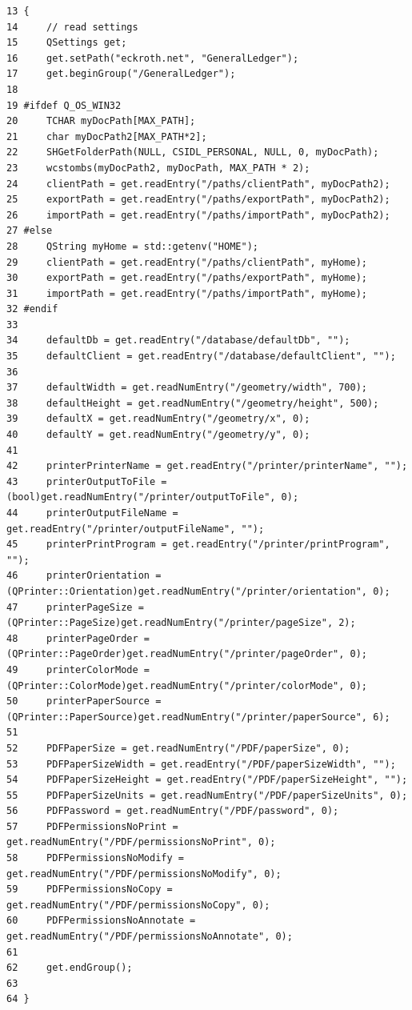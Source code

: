 \footnotesize\begin{verbatim}13 {
14     // read settings
15     QSettings get;
16     get.setPath("eckroth.net", "GeneralLedger");
17     get.beginGroup("/GeneralLedger");
18     
19 #ifdef Q_OS_WIN32
20     TCHAR myDocPath[MAX_PATH];
21     char myDocPath2[MAX_PATH*2];
22     SHGetFolderPath(NULL, CSIDL_PERSONAL, NULL, 0, myDocPath);
23     wcstombs(myDocPath2, myDocPath, MAX_PATH * 2);
24     clientPath = get.readEntry("/paths/clientPath", myDocPath2);
25     exportPath = get.readEntry("/paths/exportPath", myDocPath2);
26     importPath = get.readEntry("/paths/importPath", myDocPath2);
27 #else
28     QString myHome = std::getenv("HOME");
29     clientPath = get.readEntry("/paths/clientPath", myHome);
30     exportPath = get.readEntry("/paths/exportPath", myHome);
31     importPath = get.readEntry("/paths/importPath", myHome);
32 #endif
33 
34     defaultDb = get.readEntry("/database/defaultDb", "");
35     defaultClient = get.readEntry("/database/defaultClient", "");
36 
37     defaultWidth = get.readNumEntry("/geometry/width", 700);
38     defaultHeight = get.readNumEntry("/geometry/height", 500);
39     defaultX = get.readNumEntry("/geometry/x", 0);
40     defaultY = get.readNumEntry("/geometry/y", 0);
41 
42     printerPrinterName = get.readEntry("/printer/printerName", "");
43     printerOutputToFile = (bool)get.readNumEntry("/printer/outputToFile", 0);
44     printerOutputFileName = get.readEntry("/printer/outputFileName", "");
45     printerPrintProgram = get.readEntry("/printer/printProgram", "");
46     printerOrientation = (QPrinter::Orientation)get.readNumEntry("/printer/orientation", 0);
47     printerPageSize = (QPrinter::PageSize)get.readNumEntry("/printer/pageSize", 2);
48     printerPageOrder = (QPrinter::PageOrder)get.readNumEntry("/printer/pageOrder", 0);
49     printerColorMode = (QPrinter::ColorMode)get.readNumEntry("/printer/colorMode", 0);
50     printerPaperSource = (QPrinter::PaperSource)get.readNumEntry("/printer/paperSource", 6);
51 
52     PDFPaperSize = get.readNumEntry("/PDF/paperSize", 0);
53     PDFPaperSizeWidth = get.readEntry("/PDF/paperSizeWidth", "");
54     PDFPaperSizeHeight = get.readEntry("/PDF/paperSizeHeight", "");
55     PDFPaperSizeUnits = get.readNumEntry("/PDF/paperSizeUnits", 0);
56     PDFPassword = get.readNumEntry("/PDF/password", 0);
57     PDFPermissionsNoPrint = get.readNumEntry("/PDF/permissionsNoPrint", 0);
58     PDFPermissionsNoModify = get.readNumEntry("/PDF/permissionsNoModify", 0);
59     PDFPermissionsNoCopy = get.readNumEntry("/PDF/permissionsNoCopy", 0);
60     PDFPermissionsNoAnnotate = get.readNumEntry("/PDF/permissionsNoAnnotate", 0);
61 
62     get.endGroup();
63     
64 }
\end{verbatim}\normalsize 


